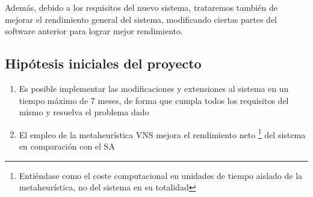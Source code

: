 Además, debido a los requisitos del nuevo sistema, trataremos también de mejorar el rendimiento general del sistema,
modificando ciertas partes del software anterior para lograr mejor rendimiento.

\subsection{Hipótesis iniciales del proyecto}
\label{sec:Hipotesis}
\begin{enumerate}[label={H\arabic*}]
    \item \label{H1} Es posible implementar las modificaciones y extensiones al sistema en un tiempo máximo de 7 meses, de forma que cumpla todos los requisitos del mismo y resuelva el problema dado %
    \item \label{H2} El empleo de la metaheurística VNS mejora el rendimiento neto
    \footnote{Entiéndase como el coste computacional en unidades de tiempo aislado de la metaheurística, no del sistema en su totalidad}
    del sistema en comparación con el SA
\end{enumerate}




